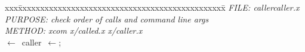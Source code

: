 \documentclass{report}
\begin{document}
\pagestyle{empty}
\begin{tabbing}
xxx\=xxxxxxxxxxxxxxxxxxxxxxxxxxxxxxxxxxxxxxxxxxxxxxx\=\kill
{\tt{}}{\em{} FILE:    callercaller.x
}\\
{\tt{}}{\em{} PURPOSE: check order of calls and command line args
}\\
{\tt{}}{\em{} METHOD:  xcom x/called.x x/caller.x
}\\
$\leftarrow$\ caller\ $\leftarrow$;\\
\end{tabbing}
\end{document}
